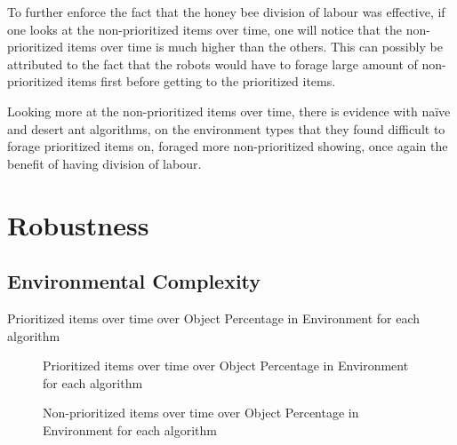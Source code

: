 To further enforce the fact that the honey bee division of labour was effective, if one looks at the non-prioritized items over time, one will notice that the non-prioritized items over time is much higher than the others. This can possibly be attributed to the fact that the robots would have to forage large amount of non-prioritized items first before getting to the prioritized items.

Looking more at the non-prioritized items over time, there is evidence with na\"ive and desert ant algorithms, on the environment types that they found difficult to forage prioritized items on, foraged more non-prioritized showing, once again the benefit of having division of labour. %

\section{Robustness}
\label{results:robustness}


\subsection{Environmental Complexity}
\label{results:environmentcomplexity}


\begin{table} [h]
     \caption{Prioritized items over time over Object Percentage in Environment  for each algorithm}
     \label{ratio}
	\centering
	\footnotesize
	
\end{table}

\begin{figure}[!htb]
\centering
\resizebox{\textwidth}{!}{}
\caption{Prioritized items over time over Object Percentage in Environment  for each algorithm}
\label{objectgoldplot}
\end{figure}


\begin{figure}[!htb]
\centering
\resizebox{\textwidth}{!}{}
\caption{Non-prioritized items over time over Object Percentage in Environment for each algorithm}
\label{objectgoldplot}
\end{figure}

